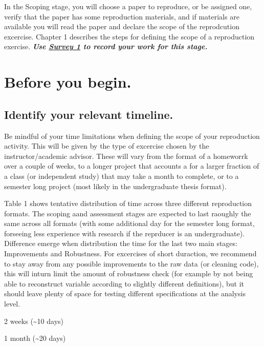 \documentclass[]{book}
\begin{document}
In the Scoping stage, you will choose a paper to reproduce, or be assigned one, verify that the paper has some reproduction materials, and if materials are available you will read the paper and declare the scope of the reprodcution excercise. Chapter 1 describes the steps for defining the scope of a reproduction exercise. \textbf{\emph{Use \href{https://berkeley.qualtrics.com/jfe/form/SV_3UWe5xu3qjeh0c5}{Survey 1} to record your work for this stage.}}

\hypertarget{before-you-begin.}{%
\section{Before you begin.}\label{before-you-begin.}}

\hypertarget{identify-your-relevant-timeline.}{%
\subsection{Identify your relevant timeline.}\label{identify-your-relevant-timeline.}}

Be mindful of your time limitations when defining the scope of your reproduction activity. This will be given by the type of excercise chosen by the instructor/academic advisor. These will vary from the format of a homeworrk over a couple of weeks, to a longer project that accounts a for a larger fraction of a class (or independent study) that may take a month to complete, or to a semester long project (most likely in the undergraduate thesis format).

Table 1 shows tentative distribution of time across three different reproduction formats. The scoping aand assessment stages are expected to last raoughly the same across all formats (with some additional day for the semester long format, forseeing less experience with research if the reprducer is an undergraduate). Difference emerge when distribution the time for the last two main stages: Improvements and Robustness. For excercises of short duraction, we recommend to stay away from any possible improvements to the raw data (or cleaning code), this will inturn limit the amount of robustness check (for example by not being able to reconstruct variable according to slightly different definitions), but it should leave plenty of space for testing different specifications at the analysis level.

2 weeks (\textasciitilde{}10 days)

1 month (\textasciitilde{}20 days)
\end{document}
